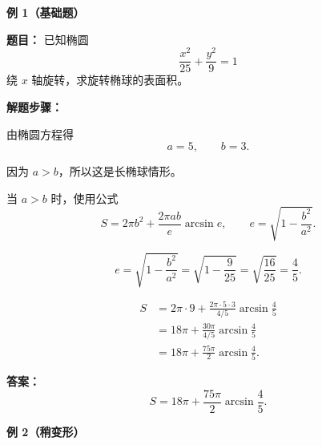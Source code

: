 \begin{examplebox}

	\textbf{\textcolor{CExample}{例 1（基础题）}}

	\textbf{\textcolor{CExample}{题目：}}
	已知椭圆
	\[
		\frac{x^{2}}{25}+\frac{y^{2}}{9}=1
	\]
	绕 $x$ 轴旋转，求旋转椭球的表面积。

	\medskip

	\textbf{\textcolor{CExample}{解题步骤：}}

	\begin{description}[style=nextline, leftmargin=2.8em, labelsep=0.5em, itemsep=0.45em]

		\item[\textbf{第一步（读取参数）：}]
		      由椭圆方程得
		      \[
			      a=5,\qquad b=3.
		      \]

		      因为 $a>b$，所以这是长椭球情形。

		\item[\textbf{第二步（选择公式）：}]
		      当 $a>b$ 时，使用公式
		      \[
			      S
			      =
			      2\pi b^{2}
			      +
			      \frac{2\pi ab}{e}\arcsin e,
			      \qquad
			      e=\sqrt{1-\frac{b^{2}}{a^{2}}}.
		      \]

		\item[\textbf{第三步（计算离心率）：}]
		      \[
			      e
			      =
			      \sqrt{1-\frac{b^{2}}{a^{2}}}
			      =
			      \sqrt{1-\frac{9}{25}}
			      =
			      \sqrt{\frac{16}{25}}
			      =
			      \frac45.
		      \]

		\item[\textbf{第四步（代入公式）：}]
		      \[
			      \begin{aligned}
				      S
				       & =
				      2\pi\cdot 9
				      +
				      \frac{2\pi\cdot 5\cdot 3}{4/5}
				      \arcsin\frac45
				      \\
				       & =
				      18\pi
				      +
				      \frac{30\pi}{4/5}
				      \arcsin\frac45
				      \\
				       & =
				      18\pi
				      +
				      \frac{75\pi}{2}
				      \arcsin\frac45.
			      \end{aligned}
		      \]

	\end{description}

	\textbf{\textcolor{CExample}{答案：}}
	\[
		\boxed{
			S
			=
			18\pi
			+
			\frac{75\pi}{2}
			\arcsin\frac45
		}.
	\]

	\medskip

	\textbf{\textcolor{CExample}{例 2（稍变形）}}


\end{examplebox}
